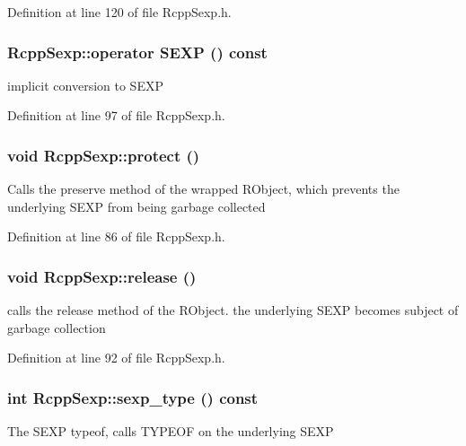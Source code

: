 Definition at line 120 of file RcppSexp.h.\hypertarget{classRcppSexp_a5e51f763919d30c1e7cb96da93c677af}{
\subsubsection[{operator SEXP}]{\setlength{\rightskip}{0pt plus 5cm}RcppSexp::operator SEXP () const}}
\label{classRcppSexp_a5e51f763919d30c1e7cb96da93c677af}
implicit conversion to SEXP 

Definition at line 97 of file RcppSexp.h.\hypertarget{classRcppSexp_af8089b6667c4d6d5a8d0db5410e3caf9}{
\subsubsection[{protect}]{\setlength{\rightskip}{0pt plus 5cm}void RcppSexp::protect ()}}
\label{classRcppSexp_af8089b6667c4d6d5a8d0db5410e3caf9}
Calls the preserve method of the wrapped RObject, which prevents the underlying SEXP from being garbage collected 

Definition at line 86 of file RcppSexp.h.\hypertarget{classRcppSexp_a4ac544b2eb8ab56023f79edbf65415ce}{
\subsubsection[{release}]{\setlength{\rightskip}{0pt plus 5cm}void RcppSexp::release ()}}
\label{classRcppSexp_a4ac544b2eb8ab56023f79edbf65415ce}
calls the release method of the RObject. the underlying SEXP becomes subject of garbage collection 

Definition at line 92 of file RcppSexp.h.\hypertarget{classRcppSexp_aee3e1880f92d8e4a69d79617813c48c6}{
\subsubsection[{sexp\_\-type}]{\setlength{\rightskip}{0pt plus 5cm}int RcppSexp::sexp\_\-type () const}}
\label{classRcppSexp_aee3e1880f92d8e4a69d79617813c48c6}
The SEXP typeof, calls TYPEOF on the underlying SEXP 

